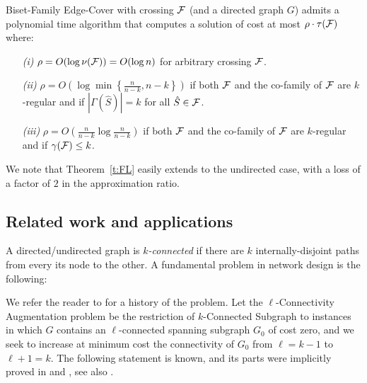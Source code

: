 \begin{theorem} \label{t:FL} 
{\sf Biset-Family Edge-Cover} with crossing ${\cal F}$ (and a directed graph $G$) 
admits a polynomial time algorithm that computes a solution of cost at most
$\rho \cdot \tau({\cal F})$ where: 
\begin{itemize}
\item[{\em (i)}]
$\rho= O(\log \nu({\cal F}))=O(\log n)$ for arbitrary crossing ${\cal F}$. 
\item[{\em (ii)}]
$\rho=O\left(\log \min\left\{\frac{n}{n-k},n-k\right\}\right)$
if both ${\cal F}$ and the co-family of ${\cal F}$ are $k$-regular 
and if $|\Gamma(\hat{S})|=k$ for all $\hat{S} \in {\cal F}$.
\item[{\em (iii)}]
$\rho=O\left(\frac{n}{n-k} \log \frac{n}{n-k}\right)$ if both ${\cal F}$ 
and the co-family of ${\cal F}$ are $k$-regular and if $\gamma({\cal F}) \leq k$.
\end{itemize}
\end{theorem}

We note that Theorem~\ref{t:FL} easily extends to the undirected case,
with a loss of a factor of $2$ in the approximation ratio.

\subsection{Related work and applications}

A directed/undirected graph is {\em $k$-connected} if there are
$k$ internally-disjoint paths from every its node to the other.
A fundamental problem in network design is the following: 

\vspace{0.1cm}


\begin{center} 
\end{center}

\vspace{0.1cm}

We refer the reader to \cite{N,FL,KN-sur} for a history of the problem.
Let the {\sf $\ell$-Connectivity Augmentation} problem be the restriction of 
{\sf $k$-Connected Subgraph} to instances in which $G$ contains an $\ell$-connected spanning 
subgraph $G_0$ of cost zero, and we seek to increase at minimum cost
the connectivity of $G_0$ from $\ell=k-1$ to $\ell+1=k$. 
The following statement is known, and its parts were implicitly proved in \cite{FJ} and \cite{RW}, see also \cite{KN2}.

